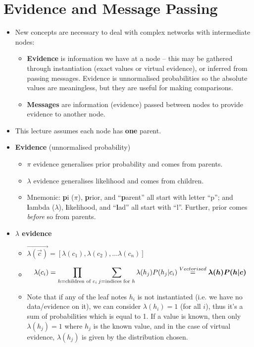 \documentclass[12pt,twoside]{article}
\begin{document}
\section{Evidence and Message Passing}

\begin{itemize}
    \item New concepts are necessary to deal with complex networks with intermediate nodes:
        \begin{itemize}
            \item \textbf{Evidence} is information we have at a node -- this may be gathered through instantiation (exact values or virtual evidence), or inferred from passing messages. Evidence is unnormalised probabilities so the absolute values are meaningless, but they are useful for making comparisons.
            \item \textbf{Messages} are information (evidence) passed between nodes to provide evidence to another node.
        \end{itemize}
    \item This lecture assumes each node has \textbf{one} parent.
    \item \textbf{Evidence} (unnormalised probability)
    \begin{itemize}
        \item \(\pi\) evidence generalises prior probability and comes from parents.
        \item \(\lambda\) evidence generalises likelihood and comes from children.
        \item Mnemonic: \textbf{p}i (\(\pi\)), \textbf{p}rior, and ``\textbf{p}arent'' all start with letter ``p''; and \textbf{l}ambda (\(\lambda\)), \textbf{l}ikelihood, and ``\textbf{l}ad'' all start with ``l''. Further, prior comes \textit{before} so from parents.
    \end{itemize}
    \item \textbf{\(\lambda\) evidence}
    \begin{itemize}
        \item \( \vec{\lambda(\vec{c})} = [\lambda(c_1), \lambda(c_2), \dots \lambda(c_n)] \)
        \item \begin{align}
                \lambda(c_i) = \prod_{h=\text{children of }c_i}\sum_{j=\text{indices for }h}\lambda(h_j)P(h_j|c_i) \stackrel{Vectorised}{=} {\boldsymbol{{\lambda(h)}}}{\boldsymbol{{P(h|c)}}}
                \end{align}
            \item Note that if any of the leaf notes \(h_i\) is not instantiated (i.e. we have no data/evidence on it), we can consider \(\lambda(h_i) =1\) (for all \(i\)), thus it's a sum of probabilities which is equal to 1. If a value is known, then only \(\lambda(h_j) =1\) where \(h_j\) is the known value, and in the case of virtual evidence, \(\lambda(h_j)\) is given by the distribution chosen.

\end{itemize}
\end{itemize}
\end{document}
